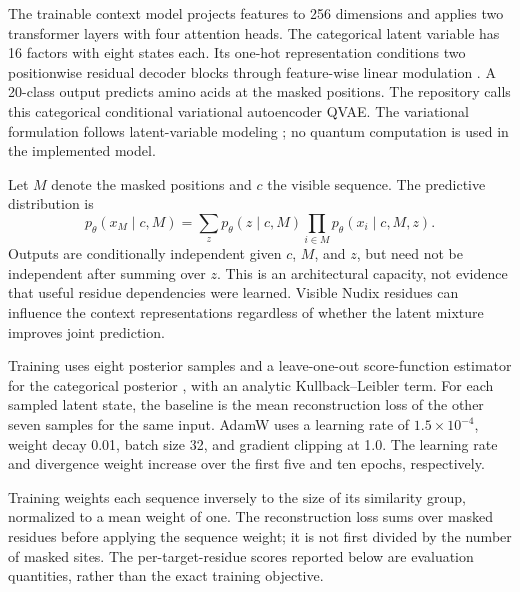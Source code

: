 \documentclass[referee,pdflatex,sn-vancouver-num]{sn-jnl}
\begin{document}
The trainable context model projects features to 256 dimensions and applies two transformer layers with four attention heads. The categorical latent variable has 16 factors with eight states each. Its one-hot representation conditions two positionwise residual decoder blocks through feature-wise linear modulation \cite{perez2018}. A 20-class output predicts amino acids at the masked positions. The repository calls this categorical conditional variational autoencoder QVAE. The variational formulation follows latent-variable modeling \cite{kingma2014}; no quantum computation is used in the implemented model.

Let $M$ denote the masked positions and $c$ the visible sequence. The predictive distribution is
\begin{equation}
 p_\theta(x_M\mid c,M)=\sum_z p_\theta(z\mid c,M)
       \prod_{i\in M}p_\theta(x_i\mid c,M,z).
\label{eq:joint}
\end{equation}
Outputs are conditionally independent given $c$, $M$, and $z$, but need not be independent after summing over $z$. This is an architectural capacity, not evidence that useful residue dependencies were learned. Visible Nudix residues can influence the context representations regardless of whether the latent mixture improves joint prediction.

Training uses eight posterior samples and a leave-one-out score-function estimator for the categorical posterior \cite{kool2019}, with an analytic Kullback--Leibler term. For each sampled latent state, the baseline is the mean reconstruction loss of the other seven samples for the same input. AdamW uses a learning rate of $1.5\times10^{-4}$, weight decay 0.01, batch size 32, and gradient clipping at 1.0. The learning rate and divergence weight increase over the first five and ten epochs, respectively.

Training weights each sequence inversely to the size of its similarity group, normalized to a mean weight of one. The reconstruction loss sums over masked residues before applying the sequence weight; it is not first divided by the number of masked sites. The per-target-residue scores reported below are evaluation quantities, rather than the exact training objective.
\end{document}
